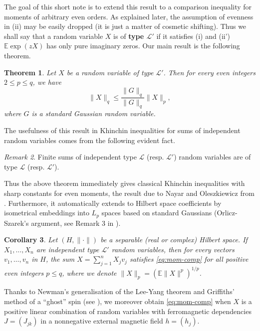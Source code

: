 \documentclass[10pt]{article}
\newcommand{\E}{\mathbb{E}}
\newcommand{\1}{\textbf{1}}
\newcommand{\sL}{\mathscr{L}}
\newtheorem{theorem}{Theorem}
\newtheorem{corollary}[theorem]{Corollary}
\theoremstyle{remark}
\newtheorem{remark}[theorem]{Remark}
\theoremstyle{definition}
\begin{document}
The goal of this short note is to extend this result to a comparison inequality for moments of arbitrary even orders. As explained later, the assumption of evenness in (ii) may be easily dropped (it is just a matter of cosmetic shifting). Thus we shall say that a random variable $X$ is of \textbf{type $\mathscr{L}'$} if it satisfies (i) and (ii') $\E\exp(zX)$ has only pure imaginary zeros.
Our main result is the following theorem.

\begin{theorem}\label{thm:mom-comp}
Let $X$ be a random variable of type $\mathscr{L}'$. Then for every even integers $2 \leq p \leq q$, we have
\begin{equation}\label{eq:mom-comp}
\|X\|_q \leq \frac{\|G\|_q}{\|G\|_q}\|X\|_p,
\end{equation}
where $G$ is a standard Gaussian random variable.
\end{theorem}

The usefulness of this result in Khinchin inequalities for sums of independent random variables comes from the following evident fact.

\begin{remark}\label{rem:typeL-sums}
Finite sums of independent type $\mathscr{L}$ (resp. $\sL'$) random variables are of type $\mathscr{L}$ (resp. $\sL'$).
\end{remark}

Thus the above theorem immediately gives classical Khinchin inequalities with sharp constants for even moments, the result due to Nayar and Oleszkiewicz from \cite{NO}. Furthermore, it automatically extends to Hilbert space coefficients by isometrical embeddings into $L_p$ spaces based on standard Gaussians (Orlicz-Szarek's argument, see Remark 3 in \cite{Sz}).   

\begin{corollary}\label{cor:Hilbert}
Let $(H,\|\cdot\|)$ be a separable (real or complex) Hilbert space. If $X_1, \ldots, X_n$ are independent type $\sL'$ random variables, then for every vectors $v_1, \ldots, v_n$ in $H$, the sum $X = \sum_{j=1}^n X_jv_j$ satisfies \eqref{eq:mom-comp} for all positive even integers $p \leq q$, where we denote $\|X\|_p = (\E\|X\|^p)^{1/p}$.
\end{corollary}


Thanks to Newman's generalisation of the Lee-Yang theorem and Griffiths' method of a ``ghost'' spin (see \cite{G, N0, N3}), we moreover obtain \eqref{eq:mom-comp} when $X$ is a positive linear combination of random variables with ferromagnetic dependencies $J=(J_{jk})$ in a nonnegative external magnetic field $h=(h_j)$.
\end{document}
